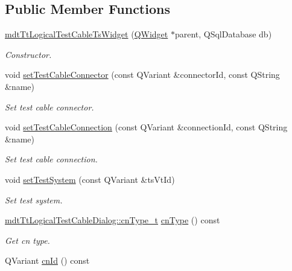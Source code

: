 \subsection*{Public Member Functions}
\begin{DoxyCompactItemize}
\item 
\hyperlink{classmdt_tt_logical_test_cable_ts_widget_ac5addba1598560e467ea342a430c9a1a}{mdt\-Tt\-Logical\-Test\-Cable\-Ts\-Widget} (\hyperlink{class_q_widget}{Q\-Widget} $\ast$parent, Q\-Sql\-Database db)
\begin{DoxyCompactList}\small\item\em Constructor. \end{DoxyCompactList}\item 
void \hyperlink{classmdt_tt_logical_test_cable_ts_widget_afd9166108bc905d461d70e74eac1b92e}{set\-Test\-Cable\-Connector} (const Q\-Variant \&connector\-Id, const Q\-String \&name)
\begin{DoxyCompactList}\small\item\em Set test cable connector. \end{DoxyCompactList}\item 
void \hyperlink{classmdt_tt_logical_test_cable_ts_widget_ab6fa7e861040ac4b81305e8d4967537d}{set\-Test\-Cable\-Connection} (const Q\-Variant \&connection\-Id, const Q\-String \&name)
\begin{DoxyCompactList}\small\item\em Set test cable connection. \end{DoxyCompactList}\item 
void \hyperlink{classmdt_tt_logical_test_cable_ts_widget_ae6e863361f1aa944aed38024c55054b6}{set\-Test\-System} (const Q\-Variant \&ts\-Vt\-Id)
\begin{DoxyCompactList}\small\item\em Set test system. \end{DoxyCompactList}\item 
\hyperlink{classmdt_tt_logical_test_cable_dialog_a3ca0cca0e179adbc5d6a024eb8ec00f8}{mdt\-Tt\-Logical\-Test\-Cable\-Dialog\-::cn\-Type\-\_\-t} \hyperlink{classmdt_tt_logical_test_cable_ts_widget_ae03ff6218dee2d66e2a9ab252f36410d}{cn\-Type} () const 
\begin{DoxyCompactList}\small\item\em Get cn type. \end{DoxyCompactList}\item 
Q\-Variant \hyperlink{classmdt_tt_logical_test_cable_ts_widget_ad3e0b90a8624392daf8581704f9fe3a4}{cn\-Id} () const 

\end{DoxyCompactItemize}
